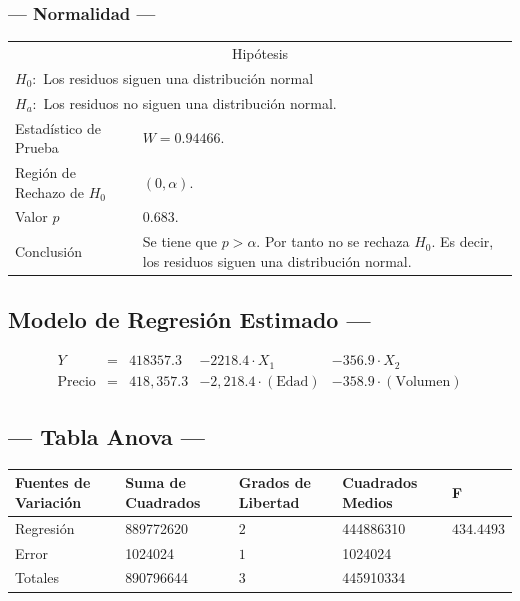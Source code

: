 \subsubsection{--- Normalidad ---} %
\begin{center}
  \begin{tabular}{|l|p{8cm}|}
    \cline{1-2}
    \multicolumn{2}{|c|}{Hipótesis}\\ \cline{1-2}
    \multicolumn{2}{|l|}{\(H_0:\) Los residuos siguen una distribución normal} \\ 
    \multicolumn{2}{|l|}{\(H_a:\) Los residuos no siguen una distribución normal.} \\ \cline{1-2}
    Estadístico de Prueba & \(W = 0.94466\).\\ \cline{1-2} 
		Región de Rechazo de \(H_0\) & \((0, \alpha )\).\\ \cline{1-2} 
    Valor \(p\) & \(0.683\).\\ \cline{1-2} 
    Conclusión & Se tiene que \(p> \alpha\). \newline 
		Por tanto no se rechaza \(H_0\). \newline 
		Es decir, los residuos siguen una distribución normal.\\ \cline{1-2} 
  \end{tabular}
\end{center}


\subsection{\centering Modelo de Regresión Estimado ---} %
\begin{align}
	Y & = &  418357.3  & -2218.4 \cdot X_1     & -356.9 \cdot X_2   \\[2mm]
	\mbox{Precio} & = &  418,357.3 & - 2,218.4 \cdot (\mbox{Edad}) & - 358.9 \cdot (\mbox{Volumen})
	\label{eq:1}
\end{align}

\subsection{\centering --- Tabla Anova ---} %
\begin{center}
  \begin{tabular}{|l|l|l|l|l|}
    \hline 
    Fuentes de Variación  & Suma de Cuadrados & Grados de Libertad & Cuadrados Medios & F\\ \hline 
    Regresión           & 889772620 &           \(2\) & 444886310 & \(434.4493\) \\ \hline 
    Error               &   1024024 &          \(1\)  &   1024024 &   \\ \hline 
    Totales             & 890796644 &          \(3\)  & 445910334 &   \\ \hline 
  \end{tabular}
\end{center} 

